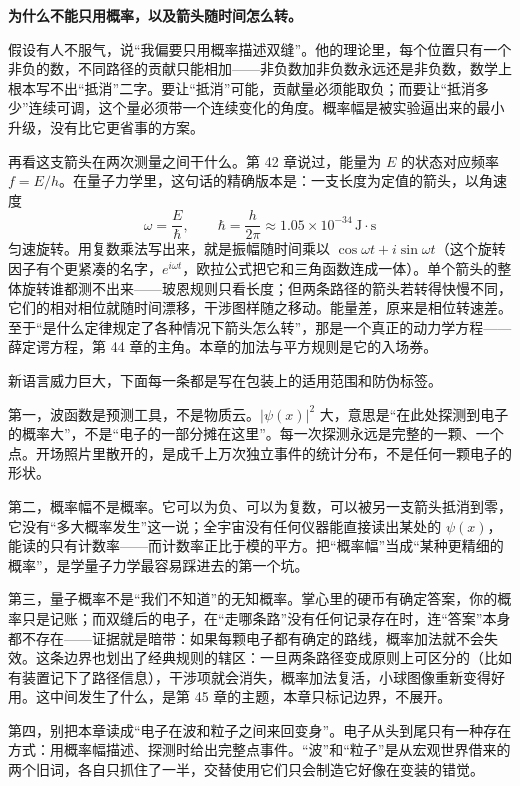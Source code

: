 \begin{challenge}
\textbf{为什么不能只用概率，以及箭头随时间怎么转。}

假设有人不服气，说“我偏要只用概率描述双缝”。他的理论里，每个位置只有一个非负的数，不同路径的贡献只能相加——非负数加非负数永远还是非负数，数学上根本写不出“抵消”二字。要让“抵消”可能，贡献量必须能取负；而要让“抵消多少”连续可调，这个量必须带一个连续变化的角度。概率幅是被实验逼出来的最小升级，没有比它更省事的方案。

再看这支箭头在两次测量之间干什么。第 42 章说过，能量为 \(E\) 的状态对应频率 \(f = E/h\)。在量子力学里，这句话的精确版本是：一支长度为定值的箭头，以角速度
\[
\omega = \frac{E}{\hbar}, \qquad \hbar = \frac{h}{2\pi} \approx 1.05\times10^{-34}\,\mathrm{J\cdot s}
\]
匀速旋转。用复数乘法写出来，就是振幅随时间乘以 \(\cos\omega t + i\sin\omega t\)（这个旋转因子有个更紧凑的名字，\(e^{i\omega t}\)，欧拉公式把它和三角函数连成一体）。单个箭头的整体旋转谁都测不出来——玻恩规则只看长度；但两条路径的箭头若转得快慢不同，它们的相对相位就随时间漂移，干涉图样随之移动。能量差，原来是相位转速差。至于“是什么定律规定了各种情况下箭头怎么转”，那是一个真正的动力学方程——薛定谔方程，第 44 章的主角。本章的加法与平方规则是它的入场券。
\end{challenge}


新语言威力巨大，下面每一条都是写在包装上的适用范围和防伪标签。

第一，波函数是预测工具，不是物质云。\(|\psi(x)|^2\) 大，意思是“在此处探测到电子的概率大”，不是“电子的一部分摊在这里”。每一次探测永远是完整的一颗、一个点。开场照片里散开的，是成千上万次独立事件的统计分布，不是任何一颗电子的形状。

第二，概率幅不是概率。它可以为负、可以为复数，可以被另一支箭头抵消到零，它没有“多大概率发生”这一说；全宇宙没有任何仪器能直接读出某处的 \(\psi(x)\)，能读的只有计数率——而计数率正比于模的平方。把“概率幅”当成“某种更精细的概率”，是学量子力学最容易踩进去的第一个坑。

第三，量子概率不是“我们不知道”的无知概率。掌心里的硬币有确定答案，你的概率只是记账；而双缝后的电子，在“走哪条路”没有任何记录存在时，连“答案”本身都不存在——证据就是暗带：如果每颗电子都有确定的路线，概率加法就不会失效。这条边界也划出了经典规则的辖区：一旦两条路径变成原则上可区分的（比如有装置记下了路径信息），干涉项就会消失，概率加法复活，小球图像重新变得好用。这中间发生了什么，是第 45 章的主题，本章只标记边界，不展开。

第四，别把本章读成“电子在波和粒子之间来回变身”。电子从头到尾只有一种存在方式：用概率幅描述、探测时给出完整点事件。“波”和“粒子”是从宏观世界借来的两个旧词，各自只抓住了一半，交替使用它们只会制造它好像在变装的错觉。

